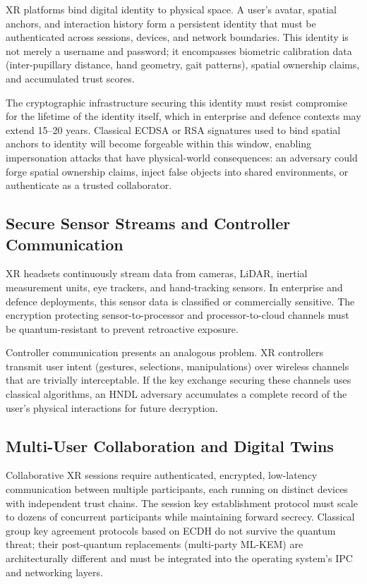 \documentclass[11pt, a4paper]{article}
\begin{document}
XR platforms bind digital identity to physical space. A user's avatar, spatial anchors, and interaction history form a persistent identity that must be authenticated across sessions, devices, and network boundaries. This identity is not merely a username and password; it encompasses biometric calibration data (inter-pupillary distance, hand geometry, gait patterns), spatial ownership claims, and accumulated trust scores.

The cryptographic infrastructure securing this identity must resist compromise for the lifetime of the identity itself, which in enterprise and defence contexts may extend 15--20 years. Classical ECDSA or RSA signatures used to bind spatial anchors to identity will become forgeable within this window, enabling impersonation attacks that have physical-world consequences: an adversary could forge spatial ownership claims, inject false objects into shared environments, or authenticate as a trusted collaborator.

\subsection{Secure Sensor Streams and Controller Communication}\label{sec:xr-sensors}

XR headsets continuously stream data from cameras, LiDAR, inertial measurement units, eye trackers, and hand-tracking sensors. In enterprise and defence deployments, this sensor data is classified or commercially sensitive. The encryption protecting sensor-to-processor and processor-to-cloud channels must be quantum-resistant to prevent retroactive exposure.

Controller communication presents an analogous problem. XR controllers transmit user intent (gestures, selections, manipulations) over wireless channels that are trivially interceptable. If the key exchange securing these channels uses classical algorithms, an HNDL adversary accumulates a complete record of the user's physical interactions for future decryption.

\subsection{Multi-User Collaboration and Digital Twins}\label{sec:xr-multiuser}

Collaborative XR sessions require authenticated, encrypted, low-latency communication between multiple participants, each running on distinct devices with independent trust chains. The session key establishment protocol must scale to dozens of concurrent participants while maintaining forward secrecy. Classical group key agreement protocols based on ECDH do not survive the quantum threat; their post-quantum replacements (multi-party ML-KEM) are architecturally different and must be integrated into the operating system's IPC and networking layers.
\end{document}
